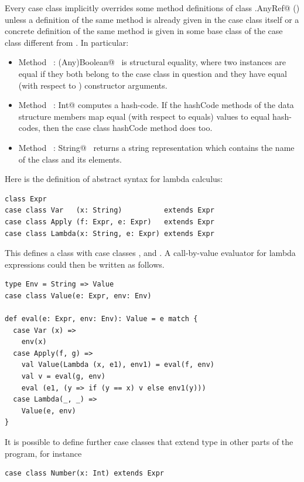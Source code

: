 Every case class implicitly overrides some method definitions of class
\lstinline@scala.AnyRef@ () unless a definition of the same
method is already given in the case class itself or a concrete
definition of the same method is given in some base class of the case
class different from . In particular:
\begin{itemize}
\item[] Method ~\lstinline@equals: (Any)Boolean@~ is structural equality, where two
instances are equal if they both belong to the case class in question and they
have equal (with respect to ) constructor arguments.
\item[] 
Method ~\lstinline@hashCode: Int@ computes a hash-code. If the hashCode methods
of the data structure members map equal (with respect to equals)
values to equal hash-codes, then the case class hashCode method does
too.
\item[] Method ~\lstinline@toString: String@~ returns a string representation which
contains the name of the class and its elements.
\end{itemize}

\example Here is the definition of abstract syntax for lambda
calculus:

\begin{lstlisting}
class Expr 
case class Var   (x: String)          extends Expr
case class Apply (f: Expr, e: Expr)   extends Expr
case class Lambda(x: String, e: Expr) extends Expr 
\end{lstlisting}
This defines a class  with case classes
,  and . A call-by-value evaluator for lambda
expressions could then be written as follows.

\begin{lstlisting}
type Env = String => Value 
case class Value(e: Expr, env: Env) 

def eval(e: Expr, env: Env): Value = e match {
  case Var (x) =>
    env(x)
  case Apply(f, g) =>
    val Value(Lambda (x, e1), env1) = eval(f, env) 
    val v = eval(g, env) 
    eval (e1, (y => if (y == x) v else env1(y)))
  case Lambda(_, _) =>
    Value(e, env)
}
\end{lstlisting}

It is possible to define further case classes that extend type
 in other parts of the program, for instance
\begin{lstlisting}
case class Number(x: Int) extends Expr 
\end{lstlisting}


